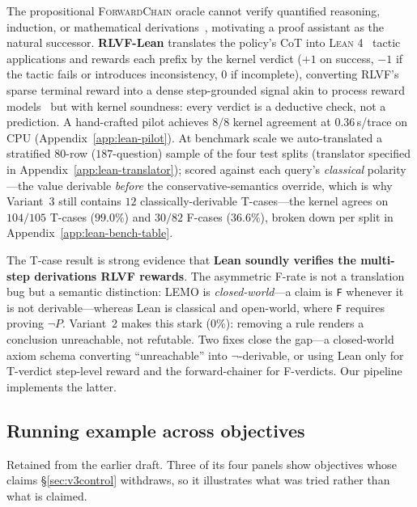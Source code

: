 \documentclass{article}
\begin{document}
The propositional \textsc{ForwardChain} oracle cannot verify quantified reasoning, induction, or mathematical derivations~\citep{davis2024benchmarks,davis2024mathematics,davis2024gpt4o1}, motivating a proof assistant as the natural successor. \textbf{RLVF-Lean} translates the policy's CoT into \textsc{Lean 4}~\citep{moura2021lean4} tactic applications and rewards each prefix by the kernel verdict ($+1$ on success, $-1$ if the tactic fails or introduces inconsistency, $0$ if incomplete), converting \textsc{RLVF}'s sparse terminal reward into a dense step-grounded signal akin to process reward models~\citep{lightman2024prm} but with kernel soundness: every verdict is a deductive check, not a prediction. A hand-crafted pilot achieves $8/8$ kernel agreement at $0.36$\,s/trace on CPU (Appendix~\ref{app:lean-pilot}). At benchmark scale we auto-translated a stratified $80$-row ($187$-question) sample of the four test splits (translator specified in Appendix~\ref{app:lean-translator}); scored against each query's \emph{classical} polarity---the value derivable \emph{before} the conservative-semantics override, which is why Variant~3 still contains $12$ classically-derivable T-cases---the kernel agrees on $104/105$ T-cases ($99.0\%$) and $30/82$ F-cases ($36.6\%$), broken down per split in Appendix~\ref{app:lean-bench-table}.

The T-case result is strong evidence that \textbf{Lean soundly verifies the multi-step derivations \textsc{RLVF} rewards}. The asymmetric F-rate is not a translation bug but a semantic distinction: LEMO is \emph{closed-world}---a claim is \texttt{F} whenever it is not derivable---whereas Lean is classical and open-world, where \texttt{F} requires proving $\neg P$. Variant~2 makes this stark ($0\%$): removing a rule renders a conclusion unreachable, not refutable. Two fixes close the gap---a closed-world axiom schema converting ``unreachable'' into $\neg$-derivable, or using Lean only for T-verdict step-level reward and the forward-chainer for F-verdicts. Our pipeline implements the latter.



\subsection{Running example across objectives}
\label{app:running}
Retained from the earlier draft. Three of its four panels show objectives whose
claims \S\ref{sec:v3control} withdraws, so it illustrates what was tried rather
than what is claimed.
\end{document}

